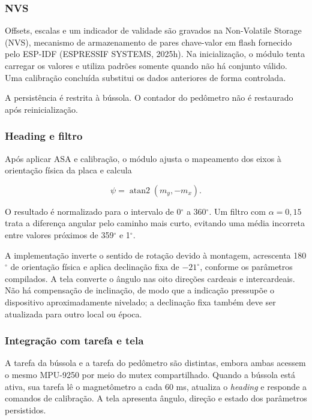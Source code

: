 \documentclass[a4paper,12pt]{article}
\begin{document}
\subsubsection{NVS}


Offsets, escalas e um indicador de validade s\~ao gravados na Non-Volatile Storage (NVS), mecanismo de armazenamento de pares chave-valor em flash fornecido pelo ESP-IDF (ESPRESSIF SYSTEMS, 2025h). Na inicializa\c{c}\~ao, o m\'odulo tenta carregar os valores e utiliza padr\~oes somente quando n\~ao h\'a conjunto v\'alido. Uma calibra\c{c}\~ao conclu\'ida substitui os dados anteriores de forma controlada.


A persist\^encia \'e restrita \`a b\'ussola. O contador do ped\^ometro n\~ao \'e restaurado ap\'os reinicializa\c{c}\~ao.


\subsubsection{Heading e filtro}


Ap\'os aplicar ASA e calibra\c{c}\~ao, o m\'odulo ajusta o mapeamento dos eixos \`a orienta\c{c}\~ao f\'isica da placa e calcula


\[
\psi=\operatorname{atan2}(m_y,-m_x).
\]


O resultado \'e normalizado para o intervalo de 0$^\circ$ a 360$^\circ$. Um filtro com $\alpha=0{,}15$ trata a diferen\c{c}a angular pelo caminho mais curto, evitando uma m\'edia incorreta entre valores pr\'oximos de 359$^\circ$ e 1$^\circ$.


A implementa\c{c}\~ao inverte o sentido de rota\c{c}\~ao devido \`a montagem, acrescenta 180$^\circ$ de orienta\c{c}\~ao f\'isica e aplica declina\c{c}\~ao fixa de $-21^\circ$, conforme os par\^ametros compilados. A tela converte o \^angulo nas oito dire\c{c}\~oes cardeais e intercardeais. N\~ao h\'a compensa\c{c}\~ao de inclina\c{c}\~ao, de modo que a indica\c{c}\~ao pressup\~oe o dispositivo aproximadamente nivelado; a declina\c{c}\~ao fixa tamb\'em deve ser atualizada para outro local ou \'epoca.


\subsubsection{Integra\c{c}\~ao com tarefa e tela}


A tarefa da b\'ussola e a tarefa do ped\^ometro s\~ao distintas, embora ambas acessem o mesmo MPU-9250 por meio do mutex compartilhado. Quando a b\'ussola est\'a ativa, sua tarefa l\^e o magnet\^ometro a cada 60 ms, atualiza o \emph{heading} e responde a comandos de calibra\c{c}\~ao. A tela apresenta \^angulo, dire\c{c}\~ao e estado dos par\^ametros persistidos.
\end{document}
